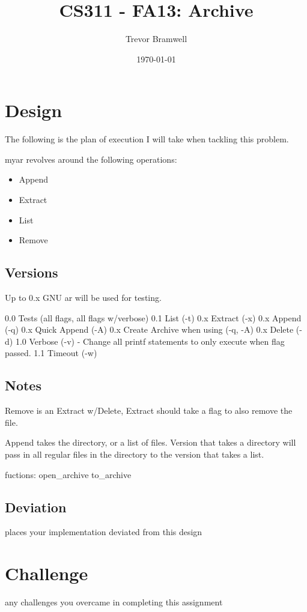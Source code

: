 \documentclass[letterpaper,10pt]{article}
\title{CS311 - FA13: Archive}
\date{\today}
\author{Trevor Bramwell}
\begin{document}
\maketitle


\section{Design}
    The following is the plan of execution I will take when tackling this
    problem.

    myar revolves around the following operations:
    \begin{itemize}
        \item Append
        \item Extract
        \item List
        \item Remove
    \end{itemize}

    

\subsection{Versions}

Up to 0.x GNU ar will be used for testing.

    0.0 Tests (all flags, all flags w/verbose)
    0.1 List (-t)
    0.x Extract (-x)
    0.x Append (-q)
    0.x Quick Append (-A)
    0.x Create Archive when using (-q, -A)
    0.x Delete (-d)
    1.0 Verbose (-v) - Change all printf statements to only execute when flag
                       passed.
    1.1 Timeout (-w)
        
\subsection{Notes}
    Remove is an Extract w/Delete, Extract should take a flag to also remove
    the file.

    Append takes the directory, or a list of files. Version that takes a
    directory will pass in all regular files in the directory to the version
    that takes a list.

    fuctions:
        open_archive
        to_archive

\subsection{Deviation}
    places your implementation deviated from this design

\section{Challenge}
    any challenges you overcame in completing this assignment
\end{document}
